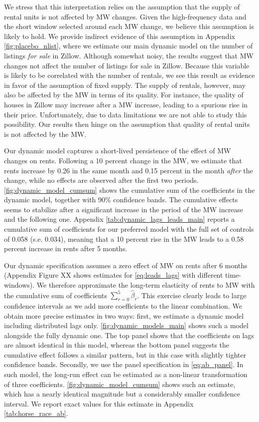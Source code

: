 We stress that this interpretation relies on the assumption that the supply of rental units is 
not affected by MW changes. Given the high-frequency data and the short window selected 
around each MW change, we believe this assumption is 
likely to hold. We provide indirect evidence of this assumption in Appendix
\autoref{fig:placebo_nlist}, where we estimate our main dynamic model on the number of listings 
\textit{for sale} in Zillow. Although somewhat noisy, the results suggest that MW changes not 
affect the number of listings for sale in Zillow. Because this variable is likely to be correlated 
with the number of rentals, we see this result as evidence in favor of the assumption of fixed supply. 
The supply of rentals, however, may also be affected by the MW in terms of its quality. For instance, 
the quality of houses in Zillow may increase after a MW increase, leading to a 
spurious rise in their price.  Unfortunately, due to data limitations we are not able to study this 
possibility. Our results then hinge on the assumption that quality of rental units is not affected 
by the MW.

Our dynamic model captures a short-lived persistence of the effect of MW changes on rents. Following a 10 percent 
change in the MW, we estimate that rents increase by 0.26 in the same month and 0.15 percent in the 
month \textit{after} the change, while no effects are observed after the first two periods. 
\autoref{fig:dynamic_model_cumsum} shows the cumulative sum of the coefficients in the dynamic model,
together with 90\% confidence bands. The cumulative effects seems to stabilize after a significant 
increase in the period of the MW increase and the following one. Appendix \autoref{tab:dynamic_lags_leads_main}
reports a cumulative sum of coefficients for our preferred model with the full set of controls 
of 0.058 (s.e. 0.034), meaning that a 10 percent rise in the MW leads to a 0.58 percent increase 
in rents after 5 months.

Our dynamic specification assumes a zero effect of MW on rents after 6 months (Appendix Figure XX
shows estimates for \autoref{eq:leads_lags} with different time-windows). We therefore approximate the 
long-term elasticity of rents to MW with the cumulative sum of coefficients $\sum\limits_{r=0}^{5} \hat{\beta}_{r}$.
This exercise clearly leads to large confidence intervals as we add more coefficients to the linear combination. 
We obtain more precise estimates in two ways: first, we estimate a dynamic model including distributed lags only. 
\autoref{fig:dynamic_models_main} shows such a model alongside the fully dynamic one. The top panel 
shows that the coefficients on lags are almost identical in this model, whereas the bottom panel 
suggests the cumulative effect follows a similar pattern, but in this case with slightly tighter 
confidence bands. Secondly, we use the  
panel specification in \autoref{eq:ab_panel}. In such model, the long-run effect can be estimated 
as a non-linear transformation of three coefficients. \autoref{fig:dynamic_model_cumsum} shows such 
an estimate, which has a nearly identical magnitude but a considerably smaller confidence interval.
We report exact values for this estimate in Appendix \autoref{tab:horse_race_ab}.

